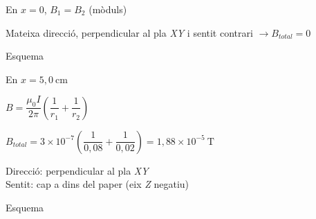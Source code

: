 \begin{solapartat}
 En $x=0$, $B_1 = B_2$ (mòduls)

 Mateixa direcció, perpendicular al pla \textit{XY} i sentit contrari $\rightarrow B_\mathit{total} = 0$

 Esquema
\end{solapartat}

\begin{solapartat}
\begin{minipage}[t]{0.5\linewidth}
En $x=5,0\ \mathrm{cm}$

 $B = \dfrac{\mu_0 I}{2\pi}\left(\dfrac{1}{r_1} + \dfrac{1}{r_2}\right)$
\end{minipage}\hfill
\begin{minipage}[t]{0.46\linewidth}
\vspace{0pt}
\end{minipage}

 $B_\mathit{total} = 3\times 10^{-7}\left(\dfrac{1}{0,08} + \dfrac{1}{0,02}\right) = 1,88\times 10^{-5}\ \mathrm{T}$

 Direcció: perpendicular al pla \textit{XY}\\
Sentit: cap a dins del paper (eix \textit{Z} negatiu)

 Esquema
\end{solapartat}
